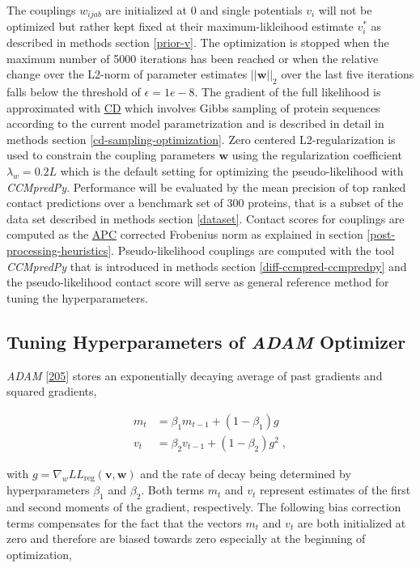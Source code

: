 \documentclass[11pt,a4paper,twoside]{book}
\newcommand{\LLreg}{L\!L_\mathrm{reg}}
\renewcommand{\v}{\mathbf{v}}
\newcommand{\vi}{v_{i}}
\newcommand{\w}{\mathbf{w}}
\newcommand{\wijab}{w_{ijab}}
\theoremstyle{definition}
\theoremstyle{definition}
\theoremstyle{remark}
\begin{document}
The couplings \(\wijab\) are initialized at 0 and single potentials
\(\vi\) will not be optimized but rather kept fixed at their
maximum-likleihood estimate \(\vi^*\) as described in methods section
\ref{prior-v}. The optimization is stopped when the maximum number of
5000 iterations has been reached or when the relative change over the
L2-norm of parameter estimates \(||\w||_2\) over the last five
iterations falls below the threshold of \(\epsilon = 1e-8\). The
gradient of the full likelihood is approximated with
\protect\hyperlink{abbrev}{CD} which involves Gibbs sampling of protein
sequences according to the current model parametrization and is
described in detail in methods section \ref{cd-sampling-optimization}.
Zero centered L2-regularization is used to constrain the coupling
parameters \(\w\) using the regularization coefficient
\(\lambda_w = 0.2L\) which is the default setting for optimizing the
pseudo-likelihood with \emph{CCMpredPy}. Performance will be evaluated
by the mean precision of top ranked contact predictions over a benchmark
set of 300 proteins, that is a subset of the data set described in
methods section \ref{dataset}. Contact scores for couplings are computed
as the \protect\hyperlink{abbrev}{APC} corrected Frobenius norm as
explained in section \ref{post-processing-heuristics}. Pseudo-likelihood
couplings are computed with the tool \emph{CCMpredPy} that is introduced
in methods section \ref{diff-ccmpred-ccmpredpy} and the
pseudo-likelihood contact score will serve as general reference method
for tuning the hyperparameters.

\subsection{\texorpdfstring{Tuning Hyperparameters of \emph{ADAM}
Optimizer}{Tuning Hyperparameters of ADAM Optimizer}}\label{methods-full-likelihood-adam}

\emph{ADAM} {[}\protect\hyperlink{ref-Kingma2014}{205}{]} stores an
exponentially decaying average of past gradients and squared gradients,

\begin{align}
  m_t &= \beta_1 m_{t−1} + (1 − \beta_1) g \\
  v_t &= \beta_2 v_{t−1} + (1 − \beta_2) g^2 \; ,
\end{align}

with \(g = \nabla_w \LLreg(\v,\w)\) and the rate of decay being
determined by hyperparameters \(\beta_1\) and \(\beta_2\). Both terms
\(m_t\) and \(v_t\) represent estimates of the first and second moments
of the gradient, respectively. The following bias correction terms
compensates for the fact that the vectors \(m_t\) and \(v_t\) are both
initialized at zero and therefore are biased towards zero especially at
the beginning of optimization,
\end{document}
